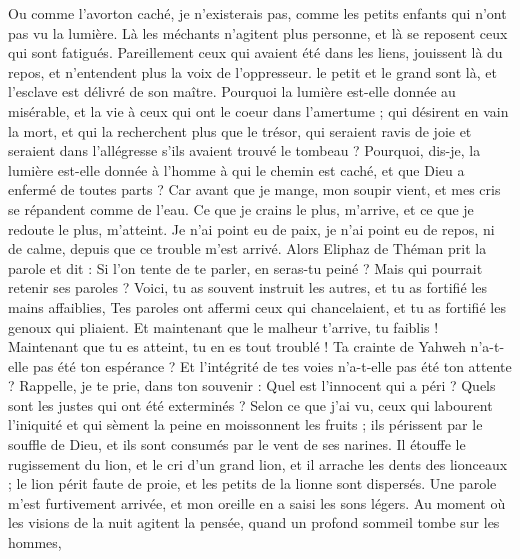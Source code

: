 \begin{multicols}{2}
Ou comme l'avorton caché, je n'existerais pas, comme les petits enfants qui n'ont pas vu la lumière.
Là les méchants n'agitent plus personne, et là se reposent ceux qui sont fatigués. 
Pareillement ceux qui avaient été dans les liens, jouissent là du repos, et n'entendent plus la voix de l'oppresseur. 
le petit et le grand sont là, et l'esclave est délivré de son maître.
Pourquoi la lumière est-elle donnée au misérable, et la vie à ceux qui ont le coeur dans l'amertume ;
qui désirent en vain la mort, et qui la recherchent plus que le trésor,
qui seraient ravis de joie et seraient dans l'allégresse s'ils avaient trouvé le tombeau ?
Pourquoi, dis-je, la lumière est-elle donnée à l'homme à qui le chemin est caché, et que Dieu a enfermé de toutes parts ?
Car avant que je mange, mon soupir vient, et mes cris se répandent comme de l'eau. 
Ce que je crains le plus, m'arrive, et ce que je redoute le plus, m'atteint. 
Je n'ai point eu de paix, je n'ai point eu de repos, ni de calme, depuis que ce trouble m'est arrivé. 
\VerseOne{}Alors Eliphaz de Théman prit la parole et dit :
Si l'on tente de te parler, en seras-tu peiné ? Mais qui pourrait retenir ses paroles ?
Voici, tu as souvent instruit les autres, et tu as fortifié les mains affaiblies,
Tes paroles ont affermi ceux qui chancelaient, et tu as fortifié les genoux qui pliaient.
Et maintenant que le malheur t'arrive, tu faiblis ! Maintenant que tu es atteint, tu en es tout troublé !
 Ta crainte de Yahweh n'a-t-elle pas été ton espérance ? Et l'intégrité de tes voies n'a-t-elle pas été ton attente ? 
Rappelle, je te prie, dans ton souvenir : Quel est l'innocent qui a péri ? Quels sont les justes qui ont été exterminés ?
Selon ce que j'ai vu, ceux qui labourent l'iniquité et qui sèment la peine en moissonnent les fruits ;
ils périssent par le souffle de Dieu, et ils sont consumés par le vent de ses narines.
Il étouffe le rugissement du lion, et le cri d'un grand lion, et il arrache les dents des lionceaux ;
le lion périt faute de proie, et les petits de la lionne sont dispersés.
Une parole m'est furtivement arrivée, et mon oreille en a saisi les sons légers.
Au moment où les visions de la nuit agitent la pensée, quand un profond sommeil tombe sur les hommes,

\end{multicols}
